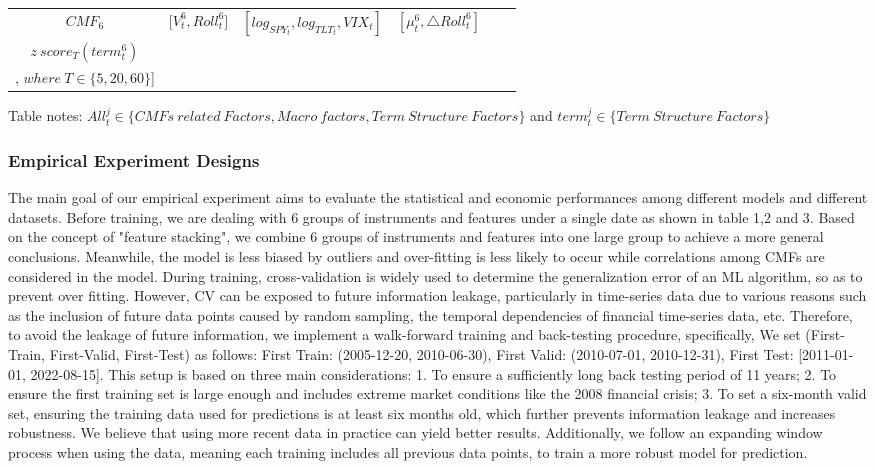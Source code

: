 \documentclass[10pt,letterpaper]{article}
\begin{document}
\begin{sidewaystable}
\begin{tabular}{|c|c|c|c|c|c|}
    \hline
    \(CMF_{6}\) & \({[V_{t}^6},{Roll_{t}^6]}\) & \([log_{SPY_t},log_{TLT_t},VIX_t]\) & \({[\mu_{t}^6, \triangle Roll_{t}^6]}\) & \makecell[c]{\([Std_{T}(All_{t}^{6}), Skew_{T}^{6}(All_{t}^{6}),Kurt_T(All_{t}^{6}),Mean_{T}(All_{t}^{6})\),\\ \(z\ score_{T}(term_{t}^{6})\)\\ , \(where \: T \in \{5,20, 60\}\)]}  \\
    \hline %
\end{tabular}
\begin{flushleft} Table notes: \( All_{t}^{j} \in \{CMFs\ related \ Factors, Macro \ factors, Term\ Structure\ Factors\}\) and \(term_{t}^{j} \in \{Term\ Structure\ Factors \}\)

\end{flushleft}
\label{table1}
\end{sidewaystable}

 \subsubsection*{Empirical Experiment Designs}
 The main goal of our empirical experiment aims to evaluate the statistical and economic performances among different models and different datasets. Before training, we are dealing with 6 groups of instruments and features under a single date as shown in table 1,2 and 3. Based on the concept of "feature stacking", we combine 6 groups of instruments and features into one large group to achieve a more general conclusions. Meanwhile, the model is less biased by outliers and over-fitting is less likely to occur while correlations among CMFs are considered in the model. During training, cross-validation is widely used to determine the generalization error of an ML algorithm, so as to prevent over fitting. However, CV can be exposed to future information leakage, particularly in time-series data due to various reasons such as the inclusion of future data points caused by random sampling, the temporal dependencies of financial time-series data, etc. Therefore, to avoid the leakage of future information, we implement a walk-forward training and back-testing procedure, specifically, We set (First-Train, First-Valid, First-Test) as follows: First Train: (2005-12-20, 2010-06-30), First Valid: (2010-07-01, 2010-12-31), First Test: [2011-01-01, 2022-08-15]. This setup is based on three main considerations: 1. To ensure a sufficiently long back testing period of 11 years; 2. To ensure the first training set is large enough and includes extreme market conditions like the 2008 financial crisis; 3. To set a six-month valid set, ensuring the training data used for predictions is at least six months old, which further prevents information leakage and increases robustness. We believe that using more recent data in practice can yield better results. Additionally, we follow an expanding window process  when using the data, meaning each training includes all previous data points, to train a more robust model for prediction.
\end{document}

